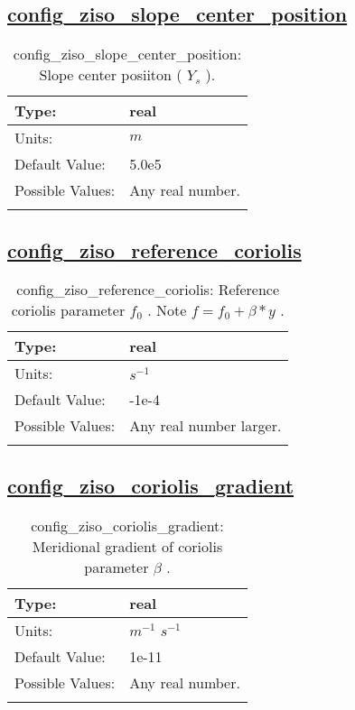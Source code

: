 \subsection[config\_ziso\_slope\_center\_position]{\hyperref[sec:nm_tab_ziso]{config\_ziso\_slope\_center\_position}}
\label{subsec:nm_sec_config_ziso_slope_center_position}
\begin{center}
\begin{longtable}{| p{2.0in} || p{4.0in} |}
    \hline
    Type: & real \\
    \hline
    Units: & $m$ \\
    \hline
    Default Value: & 5.0e5 \\
    \hline
    Possible Values: & Any real number. \\
    \hline
    \caption{config\_ziso\_slope\_center\_position:  Slope center posiiton ( $Y_s$ ).}
\end{longtable}
\end{center}
\subsection[config\_ziso\_reference\_coriolis]{\hyperref[sec:nm_tab_ziso]{config\_ziso\_reference\_coriolis}}
\label{subsec:nm_sec_config_ziso_reference_coriolis}
\begin{center}
\begin{longtable}{| p{2.0in} || p{4.0in} |}
    \hline
    Type: & real \\
    \hline
    Units: & $s^{-1}$ \\
    \hline
    Default Value: & -1e-4 \\
    \hline
    Possible Values: & Any real number larger. \\
    \hline
    \caption{config\_ziso\_reference\_coriolis:  Reference coriolis parameter  $f_0$ . Note  $f = f_0 + \beta * y$ .}
\end{longtable}
\end{center}
\subsection[config\_ziso\_coriolis\_gradient]{\hyperref[sec:nm_tab_ziso]{config\_ziso\_coriolis\_gradient}}
\label{subsec:nm_sec_config_ziso_coriolis_gradient}
\begin{center}
\begin{longtable}{| p{2.0in} || p{4.0in} |}
    \hline
    Type: & real \\
    \hline
    Units: & $m^{-1}$ $s^{-1}$ \\
    \hline
    Default Value: & 1e-11 \\
    \hline
    Possible Values: & Any real number. \\
    \hline
    \caption{config\_ziso\_coriolis\_gradient:  Meridional gradient of coriolis parameter  $\beta$ .}
\end{longtable}
\end{center}
